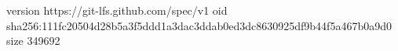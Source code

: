 version https://git-lfs.github.com/spec/v1
oid sha256:111fc20504d28b5a3f5ddd1a3dac3ddab0ed3dc8630925df9b44f5a467b0a9d0
size 349692

